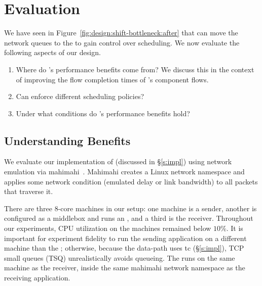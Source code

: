 \section{Evaluation}\label{s:eval}

We have seen in Figure~\ref{fig:design:shift-bottleneck:after} that \name can move the network queues to the \inbox to gain control over scheduling. 
We now evaluate the following aspects of our design.
\begin{enumerate}
    \item Where do \name's performance benefits come from? We discuss this in the context of improving the flow completion times of \name's component flows.
    \item Can \name enforce different scheduling policies?
    \item Under what conditions do \name's performance benefits hold?
\end{enumerate}

\subsection{Understanding Benefits}\label{s:eval:fct}

We evaluate our implementation of \name (discussed in \S\ref{s:impl}) using network emulation via mahimahi~\cite{mahimahi}.
Mahimahi creates a Linux network namespace and applies some network condition (emulated delay or link bandwidth) to all packets that traverse it.

There are three $8$-core machines in our setup: one machine is a sender, another is configured as a middlebox and runs an \inbox, and a third is the receiver. Throughout our experiments, CPU utilization on the machines remained below $10$\%.
It is important for experiment fidelity to run the sending application on a different machine than the \inbox; otherwise, because the \inbox data-path uses tc (\S\ref{s:impl}), TCP small queues (TSQ) unrealistically avoids queueing.
The \outbox runs on the same machine as the receiver, inside the same mahimahi network namespace as the receiving application.

